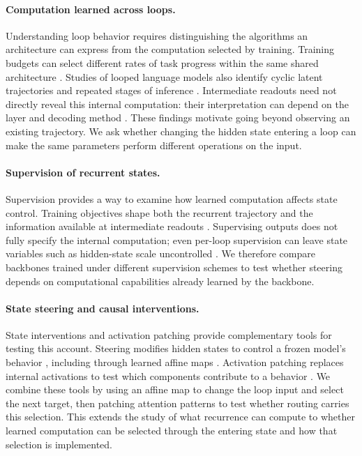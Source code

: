 \documentclass{article}
\begin{document}
\paragraph{Computation learned across loops.}
Understanding loop behavior requires distinguishing the algorithms an architecture can express from the computation selected by training. Training budgets can select different rates of task progress within the same shared architecture \citep{zhang2026recurrence}. Studies of looped language models also identify cyclic latent trajectories and repeated stages of inference \citep{blayney2026mechanistic}. Intermediate readouts need not directly reveal this internal computation: their interpretation can depend on the layer and decoding method \citep{lu2025probing}. These findings motivate going beyond observing an existing trajectory. We ask whether changing the hidden state entering a loop can make the same parameters perform different operations on the input.

\paragraph{Supervision of recurrent states.}
Supervision provides a way to examine how learned computation affects state control. Training objectives shape both the recurrent trajectory and the information available at intermediate readouts \citep{fan2026lotus,popescu2026adaptive}. Supervising outputs does not fully specify the internal computation; even per-loop supervision can leave state variables such as hidden-state scale uncontrolled \citep{sharma2026readout}. We therefore compare backbones trained under different supervision schemes to test whether steering depends on computational capabilities already learned by the backbone.

\paragraph{State steering and causal interventions.}
State interventions and activation patching provide complementary tools for testing this account. Steering modifies hidden states to control a frozen model's behavior \citep{turner2023activation}, including through learned affine maps \citep{singh2024surgery}. Activation patching replaces internal activations to test which components contribute to a behavior \citep{wang2023ioi}. We combine these tools by using an affine map to change the loop input and select the next target, then patching attention patterns to test whether routing carries this selection. This extends the study of what recurrence can compute to whether learned computation can be selected through the entering state and how that selection is implemented.
\end{document}
